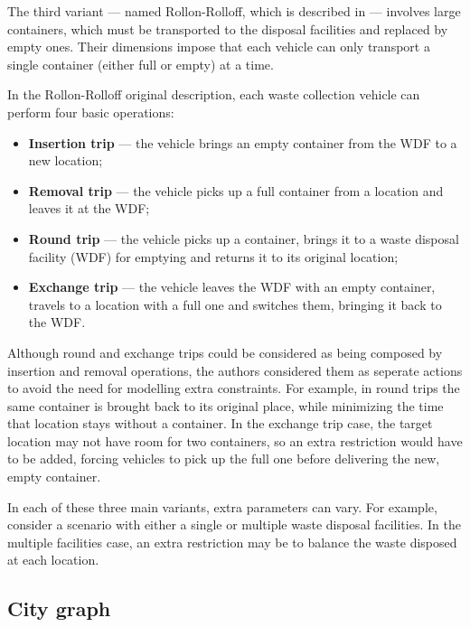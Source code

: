 The third variant --- named Rollon-Rolloff, which is described in
\cite{Bodin00} --- involves large containers, which must be transported
to the disposal facilities and replaced by empty ones. Their dimensions impose
that each vehicle can only transport a single container (either full or empty)
at a time. 

In the Rollon-Rolloff original description, each waste collection vehicle can
perform four basic operations:

\begin{itemize}
\item \textbf{Insertion trip} --- the vehicle brings an empty container from
the WDF to a new location;

\item \textbf{Removal trip} --- the vehicle picks up a full container from a
location and leaves it at the WDF;

\item \textbf{Round trip} --- the vehicle picks up a container, brings it to a
waste disposal facility (WDF) for emptying and returns it to its original
location;

\item \textbf{Exchange trip} --- the vehicle leaves the WDF with an empty
container, travels to a location with a full one and switches them, bringing it
back to the WDF.
\end{itemize}

Although round and exchange trips could be considered as being composed by
insertion and removal operations, the authors considered them as seperate
actions to avoid the need for modelling extra constraints. For example, in
round trips the same container is brought back to its original place, while
minimizing the time that location stays without a container. In the exchange
trip case, the target location may not have room for two containers, so an
extra restriction would have to be added, forcing vehicles to pick up the full
one before delivering the new, empty container.

In each of these three main variants, extra parameters can vary. For example,
consider a scenario with either a single or multiple waste disposal facilities.
In the multiple facilities case, an extra restriction may be to balance the
waste disposed at each location.







\subsection{City graph}
\label{section:city-graph}


